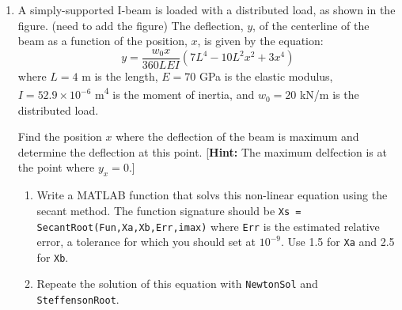 \begin{fullwidth}
\begin{enumerate}
\vspace{4.0cm}

\item A simply-supported I-beam is loaded with a distributed load, as shown in the figure. (need to add the figure)  The deflection, $y$, of the centerline of the beam as a function of the position, $x$, is given by the equation:
\begin{equation*}
y = \frac{w_0 x}{360 LEI}\left(7L^4 - 10L^2x^2 + 3x^4\right)
\end{equation*}
where $L=4$ m is the length, $E=70$ GPa is the elastic modulus, $I=52.9\times 10^{-6}$ m\textsuperscript{4} is the moment of inertia, and $w_0=20$ kN/m is the distributed load.

\vspace{0.25cm}

\noindent Find the position $x$ where the deflection of the beam is maximum and determine the deflection at this point. [\textbf{Hint:} The maximum delfection is at the point where $y_x = 0$.]
\begin{enumerate}
\item Write a MATLAB function that solvs this non-linear equation using the secant method.  The function signature should be \lstinline[style=myMatlab]{Xs = SecantRoot(Fun,Xa,Xb,Err,imax)} where \lstinline[style=myMatlab]{Err} is the estimated relative error, a tolerance for which you should set at $10^{-9}$.  Use 1.5 for \lstinline[style=myMatlab]{Xa} and 2.5 for \lstinline[style=myMatlab]{Xb}.

\item Repeate the solution of this equation with \lstinline[style=myMatlab]{NewtonSol} and \lstinline[style=myMatlab]{SteffensonRoot}.

\end{enumerate}

\end{enumerate}

\end{fullwidth}
